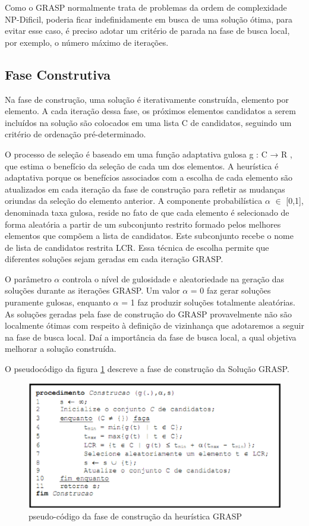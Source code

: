 Como o GRASP normalmente trata de problemas da ordem de complexidade NP-Dificil, poderia ficar indefinidamente em busca de uma solução ótima, para evitar esse caso, é preciso adotar um critério de parada na fase de busca local, por exemplo, o número máximo de iterações.

\subsection{Fase Construtiva}\label{teste}
Na fase de construção, uma solução é iterativamente construída, elemento por elemento. A cada iteração dessa fase, os próximos elementos candidatos a serem incluídos na solução são colocados em uma lista C de candidatos, seguindo um critério de ordenação pré-determinado. 

O processo de seleção é baseado em uma função adaptativa gulosa g : C → R , que estima o benefício da seleção de cada um dos elementos. A heurística é adaptativa porque os benefícios associados com a escolha de cada elemento são atualizados em cada iteração da fase de construção para refletir as mudanças oriundas da seleção do elemento anterior. A componente probabilística $\alpha$ $\in$ [0,1], denominada taxa gulosa, reside no fato de que cada elemento é selecionado de forma aleatória a partir de um subconjunto restrito formado pelos melhores elementos que compõem a lista de candidatos. Este subconjunto recebe o nome de lista de candidatos restrita LCR. Essa técnica de escolha permite que diferentes soluções sejam geradas em cada iteração GRASP.

O parâmetro $\alpha$ controla o nível de gulosidade e aleatoriedade na geração das soluções durante as iterações GRASP. Um valor $\alpha$ = 0 faz gerar soluções puramente gulosas, enquanto $\alpha$ = 1 faz produzir soluções totalmente aleatórias. 
As soluções geradas pela fase de construção do GRASP provavelmente não são localmente ótimas com respeito à definição de vizinhança que adotaremos a seguir na fase de busca local. Daí a importância da fase de busca local, a qual objetiva melhorar a solução construída.
	
O pseudocódigo da figura \ref{construction_phase} descreve a fase de construção da Solução GRASP.

\begin{figure}[H]
	\centering
	\includegraphics[scale=0.6]{graficos/grasp_construction_phase.eps}

	\caption{pseudo-código da fase de construção da heurística GRASP}
	\label{construction_phase}
\end{figure}

